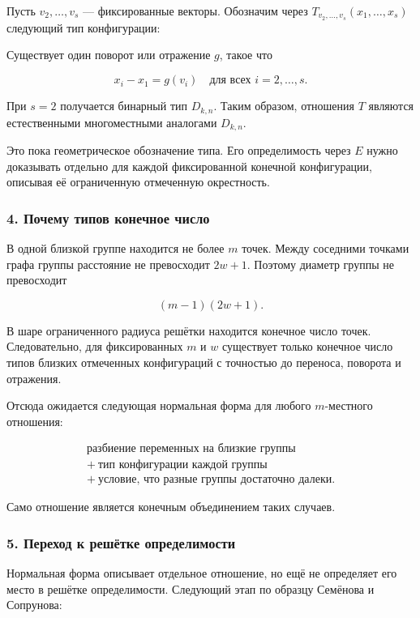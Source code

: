 Пусть $v_2,\ldots,v_s$ --- фиксированные векторы. Обозначим через
$T_{v_2,\ldots,v_s}(x_1,\ldots,x_s)$ следующий тип конфигурации:

Существует один поворот или отражение $g$, такое что

$$x_i-x_1=g(v_i)\quad\text{для всех }i=2,\ldots,s.$$

При $s=2$ получается бинарный тип $D_{k,n}$. Таким образом, отношения $T$
являются естественными многоместными аналогами $D_{k,n}$.

Это пока геометрическое обозначение типа. Его определимость через $E$ нужно
доказывать отдельно для каждой фиксированной конечной конфигурации, описывая её
ограниченную отмеченную окрестность.

\subsubsection{4. Почему типов конечное число}

В одной близкой группе находится не более $m$ точек. Между соседними точками
графа группы расстояние не превосходит $2w+1$. Поэтому диаметр группы не
превосходит

$$
(m-1)(2w+1).
$$

В шаре ограниченного радиуса решётки находится конечное число точек.
Следовательно, для фиксированных $m$ и $w$ существует только конечное число
типов близких отмеченных конфигураций с точностью до переноса, поворота и
отражения.

Отсюда ожидается следующая нормальная форма для любого $m$-местного отношения:

$$
\begin{gathered}
\text{разбиение переменных на близкие группы}\\
{}+\ \text{тип конфигурации каждой группы}\\
{}+\ \text{условие, что разные группы достаточно далеки.}
\end{gathered}
$$

Само отношение является конечным объединением таких случаев.

\subsubsection{5. Переход к решётке определимости}

Нормальная форма описывает отдельное отношение, но ещё не определяет его место
в решётке определимости. Следующий этап по образцу Семёнова и Сопрунова:

